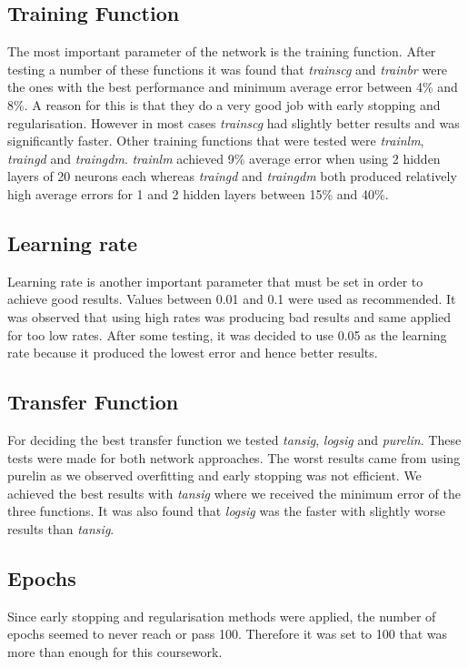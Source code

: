 \documentclass[a4paper,11pt]{article}
\begin{document}
\subsection{Training Function}
The most important parameter of the network is the training function. After testing a number of these functions it was found that \emph{trainscg} and \emph{trainbr} were the ones with the best performance and minimum average error between 4\% and 8\%. A reason for this is that they do a very good job with early stopping and regularisation. However in most cases \emph{trainscg} had slightly better results and was significantly faster. Other training functions that were tested were \emph{trainlm}, \emph{traingd} and \emph{traingdm}. \emph{trainlm} achieved 9\% average error when using 2 hidden layers of 20 neurons each whereas \emph{traingd} and \emph{traingdm} both produced relatively high average errors for 1 and 2 hidden layers between 15\% and 40\%.

\subsection{Learning rate}
Learning rate is another important parameter that must be set in order to achieve good results. Values between 0.01 and 0.1 were used as recommended. It was observed that using high rates was producing bad results and same applied for too low rates. After some testing, it was decided to use 0.05 as the learning rate because it produced the lowest error and hence better results.

\subsection{Transfer Function}
For deciding the best transfer function we tested \emph{tansig}, \emph{logsig} and \emph{purelin}. These tests were made for both network approaches. The worst results came from using purelin as we observed overfitting and early stopping was not efficient. We achieved the best results with \emph{tansig} where we received the minimum error of the three functions. It was also found that \emph{logsig} was the faster with slightly worse results than \emph{tansig}.

\subsection{Epochs}
Since early stopping and regularisation methods were applied, the number of epochs seemed to never reach or pass 100. Therefore it was set to 100 that was more than enough for this coursework.
\end{document}
